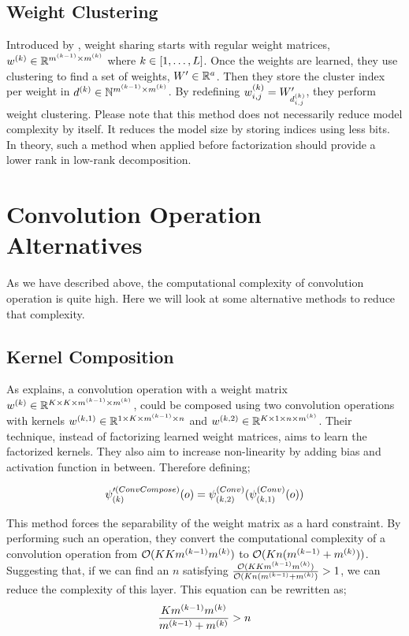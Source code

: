 \subsection{Weight Clustering}
Introduced by \cite{nowlan1992simplifying}, weight sharing starts with regular weight matrices, $w^{(k)} \in \mathbb{R}^{m^{(k-1)} \times m^{(k)}}$ where $k \in [1, \ldots, \all\layer]$. Once the weights are learned, they use clustering to find a set of weights, $\all\weights' \inreal{a}$. Then they store the cluster index per weight in $d^{(k)} \in \mathbb{N}^{m^{(k-1)} \times m^{(k)}}$. By redefining $\wk{k}_{i,j} = \all\weights'_{d^{(k)}_{i,j}}$, they perform weight clustering. Please note that this method does not necessarily reduce model complexity by itself. It reduces the model size by storing indices using less bits. In theory, such a method when applied before factorization should provide a lower rank in low-rank decomposition. 

\section{Convolution Operation Alternatives}
As we have described above, the computational complexity of convolution operation is quite high. Here we will look at some alternative methods to reduce that complexity.
\subsection{Kernel Composition}
As  \cite{alvarez2016decomposeme} explains, a convolution operation with a weight matrix $w^{(k)} \in \mathbb{R}^{K \times K \times m^{(k-1)} \times m^{(k)}}$, could be composed using two convolution operations with kernels $w^{(k,1)} \in \mathbb{R}^{1 \times K \times m^{(k-1)} \times n}$ and $w^{(k,2)} \in \mathbb{R}^{K \times 1 \times n \times m^{(k)}}$. Their technique, instead of factorizing learned weight matrices, aims to learn the factorized kernels. They also aim to increase non-linearity by adding bias and activation function in between. Therefore defining;

$$ \psi_{(k)}'^{(ConvCompose)}(o) = \psi^{(Conv)}_{(k,2)}(\psi^{(Conv)}_{(k,1)}(o))$$

This method forces the separability of the weight matrix as a hard constraint. By performing such an operation, they convert the computational complexity of a convolution operation from $\mathcal{O}(KKm^{(k-1)}m^{(k)})$ to $\mathcal{O}(K n(m^{(k-1)} +m^{(k)}))$. Suggesting that, if we can find an $n$ satisfying $\frac{\mathcal{O}(KKm^{(k-1)}m^{(k)})}{\mathcal{O}(K n(m^{(k-1)} +m^{(k)})} > 1$, we can reduce the complexity of this layer. This equation can be rewritten as;
$$ \frac{Km^{(k-1)}m^{(k)}}{m^{(k-1)} + m^{(k)}} > n$$



